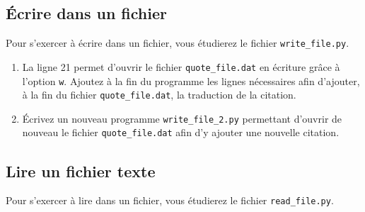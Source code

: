 
\subsection{Écrire dans un fichier}

Pour s'exercer à écrire dans un fichier, vous étudierez le fichier \texttt{write\_file.py}.

\begin{enumerate}

\item La ligne 21 permet d'ouvrir le fichier \texttt{quote\_file.dat} en écriture grâce
  à l'option \texttt{w}.
  Ajoutez à la fin du programme les lignes nécessaires afin d'ajouter, à la fin du
  fichier \texttt{quote\_file.dat}, la traduction de la citation.

\item   Écrivez   un  nouveau   programme   \texttt{write\_file\_2.py}
  permettant d'ouvrir  de nouveau le  fichier \texttt{quote\_file.dat}
  afin d'y ajouter une nouvelle citation.
    
\end{enumerate}



\subsection{Lire un fichier texte}

Pour  s'exercer à  lire dans  un  fichier, vous  étudierez le  fichier
\texttt{read\_file.py}.

